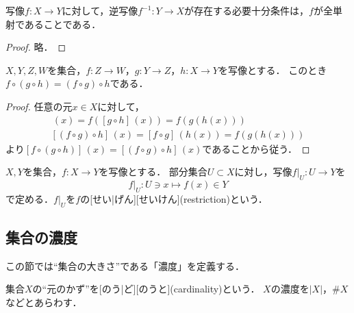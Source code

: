 \documentclass[../sotsu.tex]{subfiles}
\begin{document}
\begin{theorem}
    \label{thm:inverse-map-exists-iff}
    写像$f \colon X \to Y$に対して，逆写像$f^{-1} \colon Y \to X$が存在する必要十分条件は，$f$が全単射であることである．
\end{theorem}

\begin{proof}
    略．
\end{proof}

\begin{proposition}
    \label{thm:map-is-associative}
    $X, Y, Z, W$を集合，$f \colon Z \to W$，$g \colon Y \to Z$，$h \colon X \to Y$を写像とする．
    このとき$f \circ (g \circ h) = (f \circ g) \circ h$である．
\end{proposition}

\begin{proof}
    任意の元$x \in X$に対して，
    \begin{gather*}
        [f \circ (g \circ h)] \, (x)
            = f([g \circ h] \, (x))
            = f(g(h(x)))
        \\
        [(f \circ g) \circ h] \, (x)
            = [f \circ g] \, (h(x))
            = f(g(h(x)))
    \end{gather*}
    より$[f \circ (g \circ h)] \, (x) = [(f \circ g) \circ h] \, (x)$であることから従う．
\end{proof}


\begin{definition}[写像の制限]
    \label{dfn:restriction}
    $X, Y$を集合，$f \colon X \to Y$を写像とする．
    部分集合$U \subset X$に対し，写像$f \vert_{U} \colon U \to Y$を
    \begin{equation*}
        f \vert_U  \colon  U \ni x \longmapsto f(x) \in Y
    \end{equation*}
    で定める．$f \vert_U$を$f$の[せい|げん][せいけん](restriction)という．
\end{definition}


\subsection{集合の濃度}

この節では``集合の大きさ''である「濃度」を定義する．


\begin{definition}
    集合$X$の``元のかず''を[のう|ど][のうと](cardinality)という．
    $X$の濃度を$\lvert X \rvert$，$\# X$などとあらわす．
\end{definition}
\end{document}
